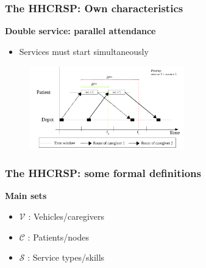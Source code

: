 \begin{frame}
   \frametitle{The HHCRSP: Own characteristics}
   \textbf{Double service: parallel attendance}
   \begin{itemize}
      \item Services must start simultaneously
   \end{itemize}

   \begin{figure}
      \centering
      \includegraphics[width=0.6\textwidth,page=2]{fig/sync-tsn2}
   \end{figure}
\end{frame}

\begin{frame}
   \frametitle{The HHCRSP: some formal definitions}
   \textbf{Main sets}
   \begin{itemize}
      \item $\mathcal{V}$ : Vehicles/caregivers
      \item $\mathcal{C}$ : Patients/nodes
      \item $\mathcal{S}$ : Service types/skills
   \end{itemize}

\end{frame}

